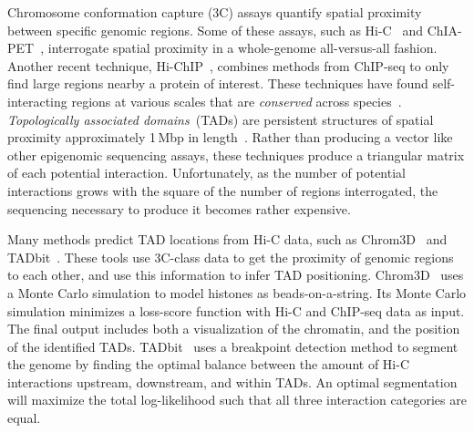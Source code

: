 \documentclass[5p]{elsarticle}
\newcommand{\rev}[1]{{\color{black}#1}}
\begin{document}
Chromosome conformation capture (3C) assays quantify sp\-atial proximity between specific genomic regions.
Some of these assays, such as Hi-C~\cite{Lieberman-Aiden2009ComprehensiveGenome} and ChIA-PET~\cite{Fullwood2009AnInteractome}, interrogate spatial proximity in a whole-genome all-versus-all fashion.
Another recent technique, Hi-ChIP~\cite{Mumbach2016HiChIP:Architecture}, combines methods from ChIP-seq to only find large regions nearby a protein of interest.
These techniques have found self-interact\-ing regions at various scales that are \emph{conserved} across species~\cite{Dixon2012TopologicalInteractions}.
\emph{Topologically associated domains}~(TADs) are persistent structures of spatial proximity approximately 1\,Mbp in length~\cite{Dixon2012TopologicalInteractions,Rao2014ALooping}.
Rather than producing a vector like other epigenomic sequencing assays, these techniques produce a triangular matrix of each potential interaction.
Unfortunately, as the number of potential interactions grows with the square of the number of regions interrogated, the sequencing necessary to produce it becomes rather expensive.

Many methods predict TAD locations from Hi-C data, such as Chrom3D~\cite{Paulsen2017Chrom3D:Contacts} and TADbit~\cite{Serra2017AutomaticColors}.
These tools use 3C-class data to get the proximity of genomic regions to each other, and use this information to infer TAD positioning.
Chrom3D~\cite{Paulsen2017Chrom3D:Contacts} uses a Monte Carlo simulation to model histones as beads-on-a-string.
Its Monte Carlo simulation minimizes a loss-score function \rev{with} Hi-C and ChIP-seq data as input.
The final output includes both a visualization of the chromatin, and the position of the identified TADs.
TADbit~\cite{Serra2017AutomaticColors} uses a breakpoint detection method to segment the genome by finding the optimal balance between the amount of Hi-C interactions upstream, downstream, and within TADs.
An optimal segmentation will maximize the total log-likelihood such that all three interaction categories are equal.
\end{document}
